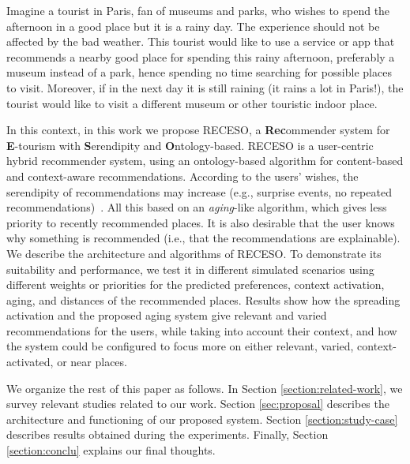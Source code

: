 Imagine a tourist in Paris, fan of museums and parks, who wishes to spend the afternoon in a good place but it is a rainy day. The experience should not be affected by the bad weather. This  tourist would like to use a service or app that recommends a nearby good place for spending this rainy afternoon, preferably a museum instead of a park, hence spending no time searching for possible places to visit. Moreover, if in the next day it is still raining (it rains a lot in Paris!),  the tourist would like to visit a different museum or other touristic indoor place.

In this context, in this work we propose RECESO, a {\bf Rec}ommender system for {\bf E}-tourism with {\bf S}erendipity and {\bf O}ntology-based. RECESO is
a user-centric hybrid recommender system, using an ontology-based algorithm for content-based and context-aware recommendations. According to the users’ wishes, the serendipity of recommendations may increase (e.g., surprise events, no repeated recommendations)~\cite{kotkov2016survey}. All this based on an {\it aging}-like algorithm, which gives less priority to recently recommended places.  It is also desirable that the user knows why something is recommended (i.e., that the recommendations are explainable). We describe the architecture and algorithms of RECESO.
To demonstrate its suitability and performance, we test it in different simulated scenarios using different weights or priorities for the predicted preferences, context activation, aging, and distances of the recommended places. Results show how the spreading activation and the proposed aging system give relevant and varied recommendations for the users, while taking into account their context, and how the system could be configured to focus more on either relevant, varied, context-activated, or near places. 

We organize the rest of this paper as follows. In Section \ref{section:related-work}, we survey 
relevant studies related to our work.
Section \ref{sec:proposal} describes the architecture and functioning of our proposed system. Section \ref{section:study-case} describes results obtained during the experiments. Finally, Section \ref{section:conclu} explains our final thoughts.


